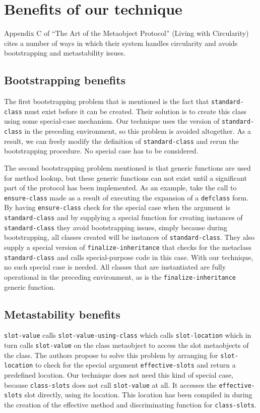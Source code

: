 \section{Benefits of our technique}
\label{sec-benefits}

Appendix C of ``The Art of the Metaobject Protocol''
\cite{Kiczales:1991:AMP:574212} (Living with Circularity) cites a
number of ways in which their system handles circularity and avoids
bootstrapping and metastability issues.

\subsection{Bootstrapping benefits}

The first bootstrapping problem that is mentioned is the fact that
\texttt{standard-class} must exist before it can be created.  Their
solution is to create this class using some special-case mechanism.
Our technique uses the version of \texttt{standard-class} in the
preceding environment, so this problem is avoided altogether.  As a
result, we can freely modify the definition of
\texttt{standard-class} and rerun the bootstrapping procedure.  No
special case has to be considered.

The second bootstrapping problem mentioned is that generic functions
are used for method lookup, but these generic functions can not exist
until a significant part of the protocol has been implemented.  As an
example, take the call to \texttt{ensure-class} made as a result of
executing the expansion of a \texttt{defclass} form.  By having
\texttt{ensure-class} check for the special case when the argument is
\texttt{standard-class} and by supplying a special function for
creating instances of \texttt{standard-class} they avoid bootstrapping
issues, simply because during bootstrapping, all classes created will
be instances of \texttt{standard-class}.  They also supply a special
version of \texttt{finalize-inheritance} that checks for the metaclass
\texttt{standard-class} and calls special-purpose code in this case.
With our technique, no such special case is needed.  All
classes that are instantiated are fully operational in the preceding
environment, as is the \texttt{finalize-inheritance} generic function.

\subsection{Metastability benefits}

\texttt{slot-value} calls \texttt{slot-value-using-class} which calls
\texttt{slot-location} which in turn calls \texttt{slot-value} on the
class metaobject to access the slot metaobjects of the class.  The
authors propose to solve this problem by arranging for
\texttt{slot-location} to check for the special argument
\texttt{effective-slots} and return a predefined location.  Our
technique does not need this kind of special case, because
\texttt{class-slots} does not call \texttt{slot-value} at all.  It
accesses the \texttt{effective-slots} slot directly, using its
location.  This location has been compiled in during the creation of
the effective method and discriminating function for
\texttt{class-slots}.


